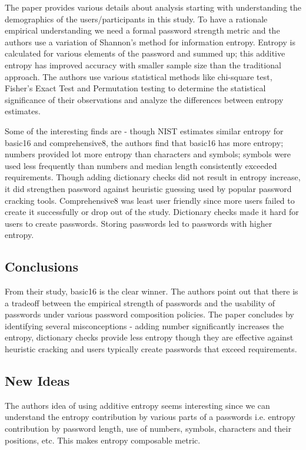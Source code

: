 \documentclass[12pt]{article}
\begin{document}
    The paper provides various details about analysis starting with understanding the demographics of the users/participants in this study. To have a rationale empirical understanding we need a formal password strength metric and the authors use a variation of Shannon's method for information entropy. Entropy is calculated for various elements of the password and summed up; this additive entropy has improved accuracy with smaller sample size than the traditional approach. The authors use various statistical methods like chi-square test, Fisher's Exact Test and Permutation testing to determine the statistical significance of their observations and analyze the differences between entropy estimates.

    Some of the interesting finds are - though NIST estimates similar entropy for basic16 and comprehensive8, the authors find that basic16 has more entropy; numbers provided lot more entropy than characters and symbols;  symbols were used less frequently than numbers and median length consistently exceeded requirements. Though adding dictionary checks did not result in entropy increase, it did strengthen password against heuristic guessing used by popular password cracking tools. Comprehensive8 was least user friendly since more users failed to create it successfully or drop out of the study. Dictionary checks made it hard for users to create passwords. Storing passwords led to passwords with higher entropy.

    \subsection*{Conclusions}
    From their study, basic16 is the clear winner. The authors point out that there is a tradeoff between the empirical strength of passwords and the usability of passwords under various password composition policies. The paper concludes by identifying several misconceptions - adding number significantly increases the entropy, dictionary checks provide less entropy though they are effective against heuristic cracking and users typically create passwords that exceed requirements.

    \subsection*{New Ideas}
    The authors idea of using additive entropy seems interesting since we can understand the entropy contribution by various parts of a passwords i.e. entropy contribution by password length, use of numbers, symbols, characters and their positions, etc. This makes entropy composable metric.
\end{document}
